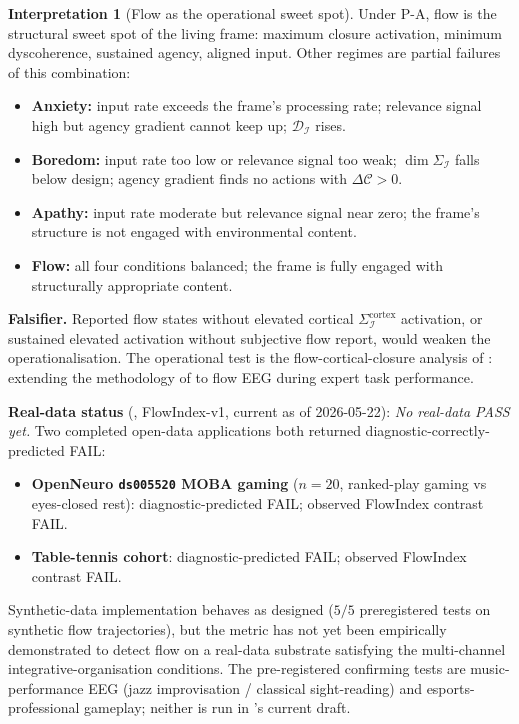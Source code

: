 \documentclass[11pt]{article}
\theoremstyle{plain}
\theoremstyle{definition}
\newtheorem{interpretation}[theorem]{Interpretation}
\theoremstyle{remark}
\newcommand{\Ical}{\mathcal{I}}
\newcommand{\Ccal}{\mathcal{C}}
\newcommand{\Dcal}{\mathcal{D}}
\begin{document}
\begin{interpretation}[Flow as the operational sweet spot]\label{int:flow}
Under P-A, flow is the structural sweet spot of the living frame: maximum closure activation, minimum dyscoherence, sustained agency, aligned input. Other regimes are partial failures of this combination:
\begin{itemize}[leftmargin=2em]
\item \textbf{Anxiety:} input rate exceeds the frame's processing rate; relevance signal high but agency gradient cannot keep up; $\Dcal_\Ical$ rises.
\item \textbf{Boredom:} input rate too low or relevance signal too weak; $\dim \Sigma_\Ical$ falls below design; agency gradient finds no actions with $\Delta \Ccal > 0$.
\item \textbf{Apathy:} input rate moderate but relevance signal near zero; the frame's structure is not engaged with environmental content.
\item \textbf{Flow:} all four conditions balanced; the frame is fully engaged with structurally appropriate content.
\end{itemize}
\end{interpretation}

\textbf{Falsifier.} Reported flow states without elevated cortical $\Sigma_\Ical^{\mathrm{cortex}}$ activation, or sustained elevated activation without subjective flow report, would weaken the operationalisation. The operational test is the flow-cortical-closure analysis of \citet{SolutionLab006}: extending the methodology of \citet{SolutionLab002} to flow EEG during expert task performance.

\textbf{Real-data status} (\citet{SolutionLab006}, FlowIndex-v1, current as of 2026-05-22): \emph{No real-data PASS yet.} Two completed open-data applications both returned diagnostic-correctly-predicted FAIL:
\begin{itemize}[leftmargin=2em]
\item \textbf{OpenNeuro \texttt{ds005520} MOBA gaming} ($n = 20$, ranked-play gaming vs eyes-closed rest): diagnostic-predicted FAIL; observed FlowIndex contrast FAIL.
\item \textbf{Table-tennis cohort}: diagnostic-predicted FAIL; observed FlowIndex contrast FAIL.
\end{itemize}

Synthetic-data implementation behaves as designed ($5/5$ preregistered tests on synthetic flow trajectories), but the metric has not yet been empirically demonstrated to detect flow on a real-data substrate satisfying the multi-channel integrative-organisation conditions. The pre-registered confirming tests are music-performance EEG (jazz improvisation / classical sight-reading) and esports-professional gameplay; neither is run in \citet{SolutionLab006}'s current draft.
\end{document}
